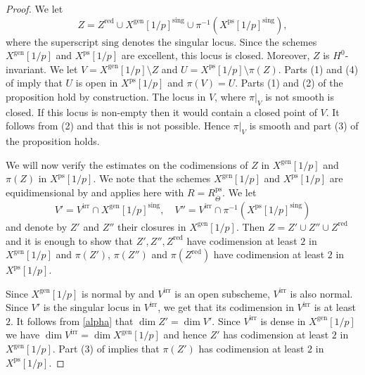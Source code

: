 \documentclass{amsart}
\theoremstyle{definition}
\theoremstyle{remark}
\newcommand{\gen}{\mathrm{gen}}
\newcommand{\red}{\mathrm{red}}
\newcommand{\irr}{\mathrm{irr}}
\newcommand{\Thetabar}{\overline{\Theta}}
\newcommand{\ps}{\mathrm{ps}}
\newcommand{\sing}{\mathrm{sing}}
\begin{document}
\begin{proof}  We let 
\begin{equation}
Z= Z^{\red}\cup X^{\gen}[1/p]^{\sing} \cup \pi^{-1}(X^{\ps}[1/p]^{\sing}),
\end{equation}
where the superscript $\sing$ denotes the singular locus. Since the schemes $X^{\gen}[1/p]$ and 
$X^{\ps}[1/p]$ are excellent, this locus is
closed. Moreover, $Z$ is $H^0$-invariant.
We let $V=X^{\gen}[1/p]\setminus Z$ and
$U=X^{\ps}[1/p]\setminus \pi(Z)$. 
Parts (1) and (4) of  
imply that $U$ is open in $X^{\ps}[1/p]$
and $\pi(V)=U$. Parts (1) and (2) of the
proposition hold by construction. 
The locus in $V$, where $\pi|_V$ is not smooth is closed. If this locus is non-empty then it would contain a closed point of $V$. It follows from (2) and  that this is not possible. Hence $\pi|_V$ is smooth and part (3) of the proposition holds. 

We will now verify the estimates on the codimensions of $Z$ in $X^{\gen}[1/p]$ and $\pi(Z)$ in $X^{\ps}[1/p]$. We note that the schemes 
$X^{\gen}[1/p]$ and $X^{\ps}[1/p]$ are equidimensional by \cite[Corollaries 13.28, 13.31]{defG} and  applies here with $R=R^{\ps}_{\Thetabar}$.
We let 
\begin{equation}
V'= V^{\irr}\cap X^{\gen}[1/p]^{\sing}, \quad V''= V^{\irr}\cap \pi^{-1}(X^{\ps}[1/p]^{\sing})
\end{equation}
and denote by $Z'$ and $Z''$ their closures
in $X^{\gen}[1/p]$. Then $Z=Z'\cup Z'' \cup Z^{\red}$ and it is enough to show that 
$Z', Z'', Z^{\red}$ have codimension at least 
$2$ in $X^{\gen}[1/p]$ and $\pi(Z')$, $\pi(Z'')$ and $\pi(Z^{\red})$ have codimension  at least $2$ in $X^{\ps}[1/p]$. 

Since $X^{\gen}[1/p]$ is normal by \cite[Corollary 15.23]{defG} and $V^{\irr}$ is an open subscheme, $V^{\irr}$ is also normal.
Since $V'$ is the singular locus in $V^{\irr}$, we get that its codimension in $V^{\irr}$ is at least $2$. 
It follows from \eqref{alpha} that $\dim Z'=\dim V'$. 
Since 
$V^{\irr}$ is dense in $X^{\gen}[1/p]$ we have 
$\dim V^{\irr}=\dim X^{\gen}[1/p]$ and hence
$Z'$ has codimension at least $2$ in $X^{\gen}[1/p]$. Part (3) of  implies that $\pi(Z')$ has codimension at least $2$ in $X^{\ps}[1/p]$.


\end{proof}
\end{document}
